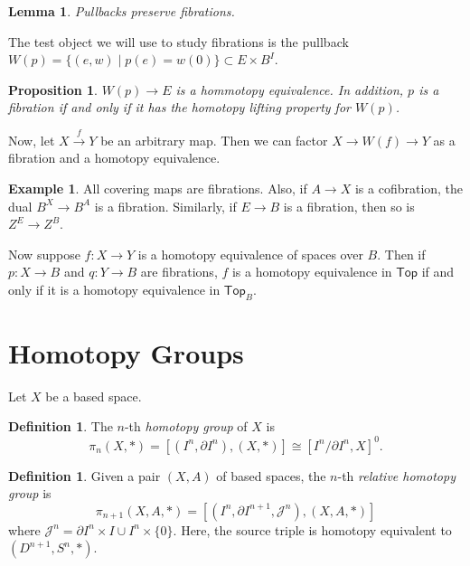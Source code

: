 \documentclass[leqno, openany]{memoir}
\newtheorem{prop}[thm]{Proposition}
\newtheorem{lem}[thm]{Lemma}
\theoremstyle{definition}
\newtheorem{defn}[thm]{Definition}
\newtheorem{exm}[thm]{Example}
\theoremstyle{remark}
\theoremstyle{plain}
\theoremstyle{definition}
\theoremstyle{remark}
\newcommand{\mc}[1]{\mathcal{#1}}
\newcommand{\ms}[1]{\mathsf{#1}}
\begin{document}
\begin{lem} Pullbacks preserve fibrations.  \end{lem}

The test object we will use to study fibrations is the pullback $W(p) = \{
(e,w) \mid p(e) = w(0) \} \subset E \times B^I$.

\begin{prop} $W(p) \to E$ is a hommotopy equivalence. In addition, $p$ is a
fibration if and only if it has the homotopy lifting property for $W(p)$.
\end{prop}

Now, let $X \xrightarrow{f} Y$ be an arbitrary map. Then we can factor $X \to
W(f) \to Y$ as a fibration and a homotopy equivalence.

\begin{exm} All covering maps are fibrations. Also, if $A \to X$ is a
cofibration, the dual $B^X \to B^A$ is a fibration. Similarly, if $E \to B$ is
a fibration, then so is $Z^E \to Z^B$.  \end{exm}

Now suppose $f \colon X \to Y$ is a homotopy equivalence of spaces over $B$.
Then if $p \colon X \to B$ and $q \colon Y \to B$ are fibrations, $f$ is a
homotopy equivalence in $\ms{Top}$ if and only if it is a homotopy equivalence
in $\ms{Top}_B$.

\section{Homotopy Groups}%

Let $X$ be a based space.

\begin{defn} The $n$-th \textit{homotopy group}  of $X$ is \[ \pi_n(X,*) =
[(I^n, \partial I^n), (X,*)] \cong [I^n / \partial I^n, X]^0. \] \end{defn}

\begin{defn} Given a pair $(X,A)$ of based spaces, the $n$-th \textit{relative
    homotopy group} is \[ \pi_{n+1}(X,A,*) = [(I^n, \partial I^{n+1},
    \mc{J}^n), (X, A, *)] \] where $\mc{J}^n = \partial I^n \times I \cup I^n
    \times \{0 \}$. Here, the source triple is homotopy equivalent to
    $(D^{n+1}, S^n, *)$.  \end{defn}
\end{document}
